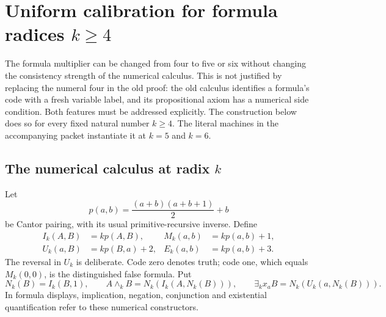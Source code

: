 \section[Uniform calibration for formula radices k >= 4]{Uniform calibration for formula radices $k\geq4$}
\label{sec:radix-calibration}

The formula multiplier can be changed from four to five or six without
changing the consistency strength of the numerical calculus. This is
not justified by replacing the numeral four in the old proof: the old
calculus identifies a formula's code with a fresh variable label, and
its propositional axiom has a numerical side condition. Both features
must be addressed explicitly. The construction below does so for every
fixed natural number $k\geq4$. The literal machines in the accompanying
packet instantiate it at $k=5$ and $k=6$.

\subsection[The numerical calculus at radix k]{The numerical calculus at radix $k$}

Let
\[
 p(a,b)=\frac{(a+b)(a+b+1)}2+b
\]
be Cantor pairing, with its usual primitive-recursive inverse. Define
\begin{align*}
 I_k(A,B)&=kp(A,B),&M_k(a,b)&=kp(a,b)+1,\\
 U_k(a,B)&=kp(B,a)+2,&E_k(a,b)&=kp(a,b)+3.
\end{align*}
The reversal in $U_k$ is deliberate. Code zero denotes truth; code one,
which equals $M_k(0,0)$, is the distinguished false formula. Put
\[
 N_k(B)=I_k(B,1),\qquad
 A\mathbin{\wedge_k}B=N_k(I_k(A,N_k(B))),\qquad
 \exists_k x_a B=N_k(U_k(a,N_k(B))).
\]
In formula displays, implication, negation, conjunction and existential
quantification refer to these numerical constructors.

